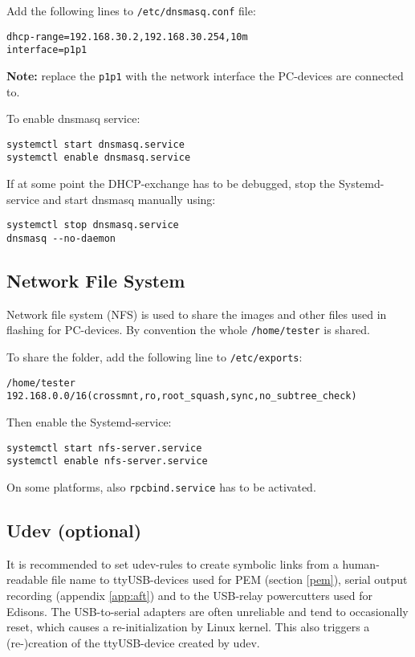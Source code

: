 \documentclass[a4paper,11pt]{article}
\newcommand{\note}{\textbf{Note: }}
\newcommand{\cmd}[1]{\texttt{#1}}
\begin{document}
Add the following lines to \cmd{/etc/dnsmasq.conf} file:
\begin{lstlisting}
dhcp-range=192.168.30.2,192.168.30.254,10m
interface=p1p1
\end{lstlisting}
\note{replace the \cmd{p1p1} with the network interface the PC-devices are connected to.}

To enable dnsmasq service:
\begin{lstlisting}
systemctl start dnsmasq.service
systemctl enable dnsmasq.service
\end{lstlisting}
If at some point the DHCP-exchange has to be debugged, stop the Systemd-service and start dnsmasq manually using:
\begin{lstlisting}
systemctl stop dnsmasq.service
dnsmasq --no-daemon
\end{lstlisting}

\subsection*{Network File System}
Network file system (NFS) is used to share the images and other files used in flashing for PC-devices. By convention the whole \cmd{/home/tester} is shared.

To share the folder, add the following line to \cmd{/etc/exports}:
\begin{lstlisting}
/home/tester 192.168.0.0/16(crossmnt,ro,root_squash,sync,no_subtree_check)
\end{lstlisting}

Then enable the Systemd-service:
\begin{lstlisting}
systemctl start nfs-server.service
systemctl enable nfs-server.service
\end{lstlisting}
On some platforms, also \cmd{rpcbind.service} has to be activated.

\subsection*{Udev (optional)}
It is recommended to set udev-rules to create symbolic links from a human-readable file name to ttyUSB-devices used for PEM (section \ref{pem}), serial output recording (appendix \ref{app:aft}) and to the USB-relay powercutters used for Edisons. The USB-to-serial adapters are often unreliable and tend to occasionally reset, which causes a re-initialization by Linux kernel. This also triggers a (re-)creation of the ttyUSB-device created by udev.
\end{document}

